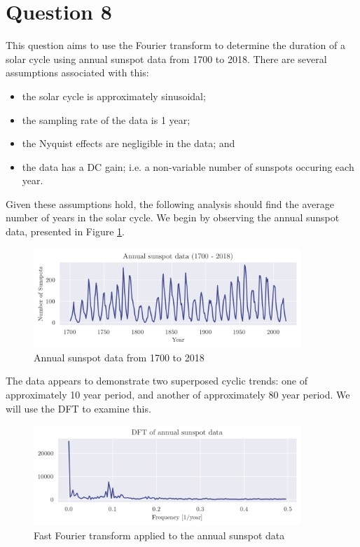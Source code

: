 \documentclass[a4paper, 11pt]{article}
\begin{document}
\newpage
\section*{Question 8}

This question aims to use the Fourier transform to determine the duration of a
solar cycle using annual sunspot data from 1700 to 2018. There are several
assumptions associated with this:
\begin{itemize}
    \item the solar cycle is approximately sinusoidal;
    \item the sampling rate of the data is 1 year;
    \item the Nyquist effects are negligible in the data; and
    \item the data has a DC gain; i.e. a non-variable number of sunspots
          occuring each year.
\end{itemize}
Given these assumptions hold, the following analysis should find the average
number of years in the solar cycle. We begin by observing the annual sunspot
data, presented in Figure \ref{fig:q9_timeseries}.

\begin{figure}[ht]
    \centering
    \includegraphics[width=0.9\textwidth]{images/q8_timeseries.png}
    \caption{Annual sunspot data from 1700 to 2018}
    \label{fig:q9_timeseries}
\end{figure}

The data appears to demonstrate two superposed cyclic trends: one of
approximately 10 year period, and another of approximately 80 year period. We
will use the DFT to examine this.

\begin{figure}[ht]
    \centering
    \includegraphics[width=0.9\textwidth]{images/q8_rawdft.png}
    \caption{Fast Fourier transform applied to the annual sunspot data}
    \label{fig:q8_rawdft}
\end{figure}
\end{document}
